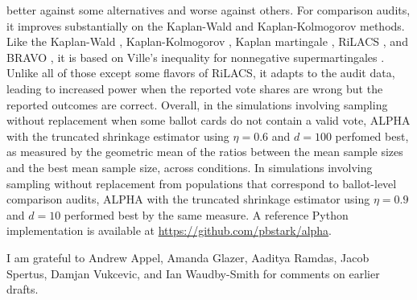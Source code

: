 \documentclass[aoas]{imsart}
\begin{document}
better against some alternatives and worse against others.
For comparison audits, it improves substantially on the Kaplan-Wald and Kaplan-Kolmogorov methods.
Like the Kaplan-Wald \citep{stark09b,stark20}, Kaplan-Kolmogorov \citep{stark20}, Kaplan martingale \citep{starkEvans19,stark20}, 
RiLACS \citep{waudby-smithEtal21}, and BRAVO \citep{lindemanEtal12}, it is based on Ville's inequality for nonnegative supermartingales \citep{ville39}.
Unlike all of those except some flavors of RiLACS, it adapts to the audit data, leading to increased power when the reported vote shares
are wrong but the reported outcomes are correct.
Overall, in the simulations involving sampling without replacement when some ballot cards do not contain a valid
vote, ALPHA with the truncated shrinkage estimator using $\eta=0.6$ and $d=100$ perfomed best, as measured by the
geometric mean of the ratios between the mean sample sizes and the best mean sample size, across conditions.
In simulations involving sampling without replacement from populations that correspond to ballot-level comparison audits,
ALPHA with the truncated shrinkage estimator using $\eta=0.9$ and $d=10$ performed best by the same measure.
A reference Python implementation is available at \url{https://github.com/pbstark/alpha}.

\begin{acks}[Acknowledgments] 
I am grateful to Andrew Appel, Amanda Glazer, Aaditya Ramdas, Jacob Spertus, Damjan Vukcevic, and Ian Waudby-Smith for comments on earlier drafts.
\end{acks}



\end{document}
